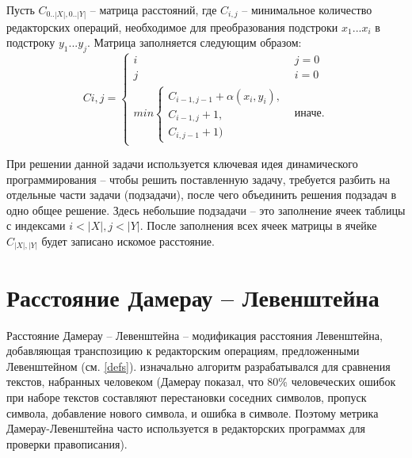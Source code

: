 Пусть $C_{0..|X|, 0..|Y|}$ -- матрица расстояний, где $C_{i, j}$ -- минимальное количество редакторских операций, необходимое для преобразования подстроки $x_1...x_i$ в подстроку $y_1...y_j$. Матрица заполняется следующим образом:
\begin{equation}\label{matrix}
	C{i, j} = 
	\begin{cases}
		i & j = 0 \\
		j & i = 0 \\
		min 
		\begin{cases}
			C_{i - 1, j - 1} + \alpha(x_i, y_i), \\
			C_{i - 1, j} + 1, \\
			C_{i, j - 1} + 1)
		\end{cases} & \text{иначе.}
	\end{cases}
\end{equation}

При решении данной задачи используется ключевая идея динамического программирования -- чтобы решить поставленную задачу, требуется разбить на отдельные части задачи (подзадачи), после чего объединить решения подзадач в одно общее решение. Здесь небольшие подзадачи -- это заполнение ячеек таблицы с индексами $i < |X|, j < |Y|$. После заполнения всех ячеек матрицы в ячейке $C_{|X|, |Y|}$ будет записано искомое расстояние.

\section{Расстояние Дамерау -- Левенштейна}
Расстояние Дамерау -- Левенштейна -- модификация расстояния Левенштейна, добавляющая транспозицию к редакторским операциям, предложенными Левенштейном (см. \ref{defs}). изначально алгоритм разрабатывался для сравнения текстов, набранных человеком (Дамерау показал\cite{damerau}, что 80\% человеческих ошибок при наборе текстов составляют перестановки соседних символов, пропуск символа, добавление нового символа, и ошибка в символе. Поэтому метрика Дамерау-Левенштейна часто используется в редакторских программах для проверки правописания). 

